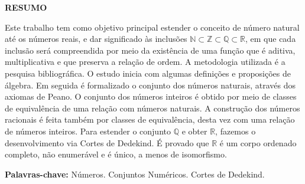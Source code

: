 \documentclass[../main.tex]{subfiles}
\begin{document}
\begin{center}
	\textbf{RESUMO}
\end{center}



  \vspace{\onelineskip}


\noindent Este trabalho tem como objetivo principal estender o conceito de número natural até os números reais, e dar significado às inclusões 
$\mathbb{N} \subset \mathbb{Z} \subset \mathbb{Q} \subset \mathbb{R}$, em que cada inclusão será compreendida por meio da existência de uma função que é aditiva, multiplicativa e que preserva a relação de ordem. A metodologia utilizada é a pesquisa bibliográfica. O estudo inicia com algumas definições e proposições de álgebra. Em seguida é formalizado o conjunto dos números naturais, através dos axiomas de Peano. O conjunto dos números inteiros é obtido por meio de classes de equivalência de uma relação com números naturais. A construção dos números racionais é feita também por classes de equivalência, desta vez com uma relação de números inteiros. Para estender o conjunto $\mathbb{Q}$ e obter $\mathbb{R}$, fazemos o desenvolvimento via Cortes de Dedekind. É provado que $\mathbb{R}$ é um corpo ordenado completo, não enumerável e é único, a menos de isomorfismo.  


 \vspace{\onelineskip}
    
 \noindent\textbf{Palavras-chave:} Números. Conjuntos Numéricos. Cortes de Dedekind.

\newpage
\end{document}
